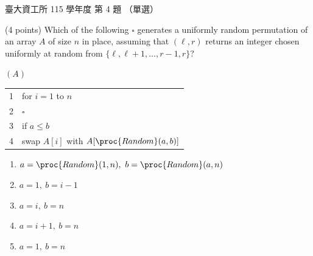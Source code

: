 \begin{pastexam}[label={px:ntu-115-dsa-04}]{臺大資工所 115 學年度 第 4 題}
（單選）

(4 points) Which of the following $\square$ generates a uniformly random permutation of an array $A$ of size $n$ in place, assuming that $(\ell,r)$ returns an integer chosen uniformly at random from $\{\ell,\ell+1,\ldots,r-1,r\}$?

$(A)$
\par\smallskip\noindent\begin{tabular}{@{}r@{\quad}l@{}}
1 & for $i=1$ to $n$\\
2 & \qquad $\square$\\
3 & \qquad if $a\le b$\\
4 & \qquad\qquad swap $A[i]$ with $A[\proc{Random}(a,b)]$
\end{tabular}\par\smallskip
\begin{enumerate}[label=(\Alph*)]
\item $a=\proc{Random}(1,n),\ b=\proc{Random}(a,n)$
\item $a=1,\ b=i-1$
\item $a=i,\ b=n$
\item $a=i+1,\ b=n$
\item $a=1,\ b=n$
\end{enumerate}
\end{pastexam}

